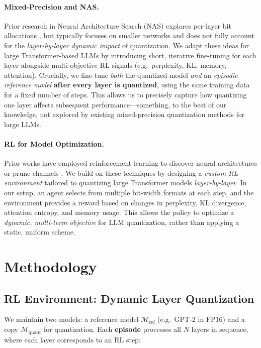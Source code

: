 \documentclass{article}
\begin{document}
	\paragraph{Mixed-Precision and NAS.}
	Prior research in Neural Architecture Search (NAS) explores per-layer bit allocations \cite{dong2019hawq,Wang2020apq}, but typically focuses on smaller networks and does not fully account for the \emph{layer-by-layer dynamic impact} of quantization. We adapt these ideas for large Transformer-based LLMs by introducing short, iterative fine-tuning for each layer alongside multi-objective RL signals (e.g.\ perplexity, KL, memory, attention). Crucially, we fine-tune \emph{both} the quantized model \emph{and} an \emph{episodic reference model} \textbf{after every layer is quantized}, using the same training data for a fixed number of steps. This allows us to precisely capture how quantizing one layer affects subsequent performance—something, to the best of our knowledge, not explored by existing mixed-precision quantization methods for large LLMs.
	
	\paragraph{RL for Model Optimization.}
	Prior works have employed reinforcement learning to discover neural architectures \cite{zoph2016neural} or prune channels \cite{he2018amc}. We build on these techniques by designing a \emph{custom RL environment} tailored to quantizing large Transformer models \emph{layer-by-layer}. In our setup, an agent selects from multiple bit-width formats at each step, and the environment provides a reward based on changes in perplexity, KL divergence, attention entropy, and memory usage. This allows the policy to optimize a \emph{dynamic, multi-term objective} for LLM quantization, rather than applying a static, uniform scheme.
	
	
	\section{Methodology}
	\label{sec:method}
	\subsection{RL Environment: Dynamic Layer Quantization}
	We maintain two models: a reference model $\mathcal{M}_{\text{ref}}$ (e.g.\ GPT-2 in FP16) and a copy $\mathcal{M}_{\text{quant}}$ for quantization. Each \textbf{episode} processes all $N$ layers in sequence, where each layer corresponds to an RL step:
	
\end{document}

